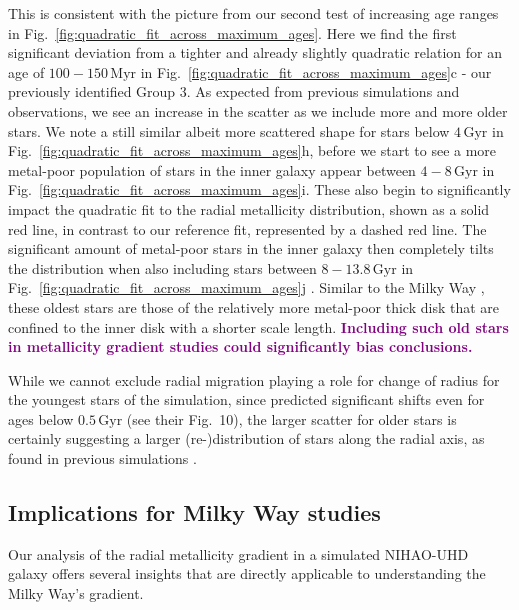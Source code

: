 \documentclass[twocolumn,apj,numberedappendix,appendixfloats,twocolappendix]{openjournal}
\newcommand{\adjusted}[1]{\textbf{\textcolor{purple}{#1}}}
\begin{document}
\begin{CJK*}{UTF8}{gbsn}
This is consistent with the picture from our second test of increasing age ranges in Fig.~\ref{fig:quadratic_fit_across_maximum_ages}. Here we find the first significant deviation from a tighter and already slightly quadratic relation for an age of $100-150\,\mathrm{Myr}$ in Fig.~\ref{fig:quadratic_fit_across_maximum_ages}c - our previously identified Group 3. As expected from previous simulations and observations, we see an increase in the scatter as we include more and more older stars. We note a still similar albeit more scattered shape for stars below $4\,\mathrm{Gyr}$ in Fig.~\ref{fig:quadratic_fit_across_maximum_ages}h, before we start to see a more metal-poor population of stars in the inner galaxy appear between $4-8\,\mathrm{Gyr}$ in Fig.~\ref{fig:quadratic_fit_across_maximum_ages}i. These also begin to significantly impact the quadratic fit to the radial metallicity distribution, shown as a solid red line, in contrast to our reference fit, represented by a dashed red line. The significant amount of metal-poor stars in the inner galaxy then completely tilts the distribution when also including stars between $8-13.8\,\mathrm{Gyr}$ in Fig.~\ref{fig:quadratic_fit_across_maximum_ages}j \citep[see also][]{Johnson2024}. Similar to the Milky Way \citep{BlandHawthorn_Gerhard2016}, these oldest stars are those of the relatively more metal-poor thick disk that are confined to the inner disk with a shorter scale length. \adjusted{Including such old stars in metallicity gradient studies could significantly bias conclusions.}

While we cannot exclude radial migration playing a role for change of radius for the youngest stars of the simulation, since \citet{Frankel2018} predicted significant shifts even for ages below $0.5\,\mathrm{Gyr}$ (see their Fig.~10), the larger scatter for older stars is certainly suggesting a larger (re-)distribution of stars along the radial axis, as found in previous simulations \citep{Minchev2010, Grand2015}.

\subsection{Implications for Milky Way studies} \label{sec:implications_milky_way}

Our analysis of the radial metallicity gradient in a simulated NIHAO-UHD galaxy offers several insights that are directly applicable to understanding the Milky Way's gradient.


\end{CJK*}
\end{document}

